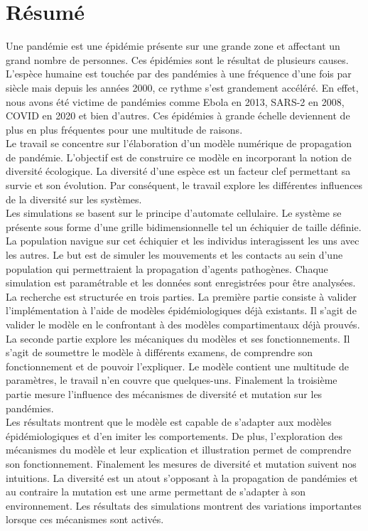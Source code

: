 \chapter{Résumé} \label{ch:resume}

Une pandémie est une épidémie présente sur une grande zone et affectant un grand nombre de personnes. Ces épidémies sont le résultat de plusieurs causes. L'espèce humaine est touchée par des pandémies à une fréquence d'une fois par siècle mais depuis les années 2000, ce rythme s'est grandement accéléré. En effet, nous avons été victime de pandémies comme Ebola en 2013, SARS-2 en 2008, COVID en 2020 et bien d'autres. Ces épidémies à grande échelle deviennent de plus en plus fréquentes pour une multitude de raisons.\\

Le travail se concentre sur l'élaboration d'un modèle numérique de propagation de pandémie. L'objectif est de construire ce modèle en incorporant la notion de diversité écologique. La diversité d'une espèce est un facteur clef permettant sa survie et son évolution. Par conséquent, le travail explore les différentes influences de la diversité sur les systèmes.\\

Les simulations se basent sur le principe d'automate cellulaire. Le système se présente sous forme d'une grille bidimensionnelle tel un échiquier de taille définie. La population navigue sur cet échiquier et les individus interagissent les uns avec les autres. Le but est de simuler les mouvements et les contacts au sein d'une population qui permettraient la propagation d'agents pathogènes. Chaque simulation est paramétrable et les données sont enregistrées pour être analysées.\\

La recherche est structurée en trois parties. La première partie consiste à valider l'implémentation à l'aide de modèles épidémiologiques déjà existants. Il s'agit de valider le modèle en le confrontant à des modèles compartimentaux déjà prouvés. La seconde partie explore les mécaniques du modèles et ses fonctionnements. Il s'agit de soumettre le modèle à différents examens, de comprendre son fonctionnement et de pouvoir l'expliquer. Le modèle contient une multitude de paramètres, le travail n'en couvre que quelques-uns. Finalement la troisième partie mesure l'influence des mécanismes de diversité et mutation sur les pandémies.\\

Les résultats montrent que le modèle est capable de s'adapter aux modèles épidémiologiques et d'en imiter les comportements. De plus, l'exploration des mécanismes du modèle et leur explication et illustration permet de comprendre son fonctionnement. Finalement les mesures de diversité et mutation suivent nos intuitions. La diversité est un atout s'opposant à la propagation de pandémies et au contraire la mutation est une arme permettant de s'adapter à son environnement. Les résultats des simulations montrent des variations importantes lorsque ces mécanismes sont activés.
